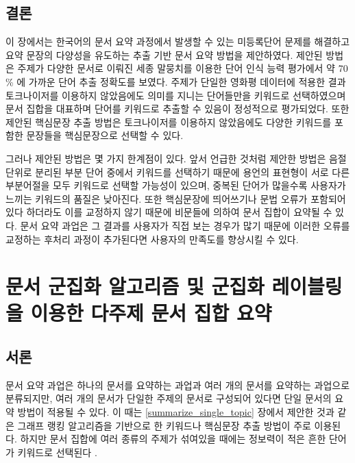 \documentclass[11pt]{article}
\begin{document}
\subsection{결론}

이 장에서는 한국어의 문서 요약 과정에서 발생할 수 있는 미등록단어 문제를 해결하고 요약 문장의 다양성을 유도하는 추출 기반 문서 요약 방법을 제안하였다.
제안된 방법은 주제가 다양한 문서로 이뤄진 세종 말뭉치를 이용한 단어 인식 능력 평가에서 약 70 \% 에 가까운 단어 추출 정확도를 보였다.
주제가 단일한 영화평 데이터에 적용한 결과 토크나이저를 이용하지 않았음에도 의미를 지니는 단어들만을 키워드로 선택하였으며 문서 집합을 대표하며 단어를 키워드로 추출할 수 있음이 정성적으로 평가되었다.
또한 제안된 핵심문장 추출 방법은 토크나이저를 이용하지 않았음에도 다양한 키워드를 포함한 문장들을 핵심문장으로 선택할 수 있다.

그러나 제안된 방법은 몇 가지 한계점이 있다.
앞서 언급한 것처럼 제안한 방법은 음절 단위로 분리된 부분 단어 중에서 키워드를 선택하기 때문에 용언의 표현형이 서로 다른 부분어절을 모두 키워드로 선택할 가능성이 있으며, 중복된 단어가 많을수록 사용자가 느끼는 키워드의 품질은 낮아진다.
또한 핵심문장에 띄어쓰기나 문법 오류가 포함되어 있다 하더라도 이를 교정하지 않기 때문에 비문들에 의하여 문서 집합이 요약될 수 있다.
문서 요약 과업은 그 결과를 사용자가 직접 보는 경우가 많기 때문에 이러한 오류를 교정하는 후처리 과정이 추가된다면 사용자의 만족도를 향상시킬 수 있다.


\newpage
\section{문서 군집화 알고리즘 및 군집화 레이블링을 이용한 다주제 문서 집합 요약} \label{improved_kmeans}

\subsection{서론}

문서 요약 과업은 하나의 문서를 요약하는 과업과 여러 개의 문서를 요약하는 과업으로 분류되지만, 여러 개의 문서가 단일한 주제의 문서로 구성되어 있다면 단일 문서의 요약 방법이 적용될 수 있다.
이 때는 \ref{summarize_single_topic} 장에서 제안한 것과 같은 그래프 랭킹 알고리즘을 기반으로 한 키워드나 핵심문장 추출 방법이 주로 이용된다.
하지만 문서 집합에 여러 종류의 주제가 섞여있을 때에는 정보력이 적은 흔한 단어가 키워드로 선택된다 \citep{goldstein2000multi, lin2002single, filippova2008sentence, filippova2010multi}.
\end{document}

